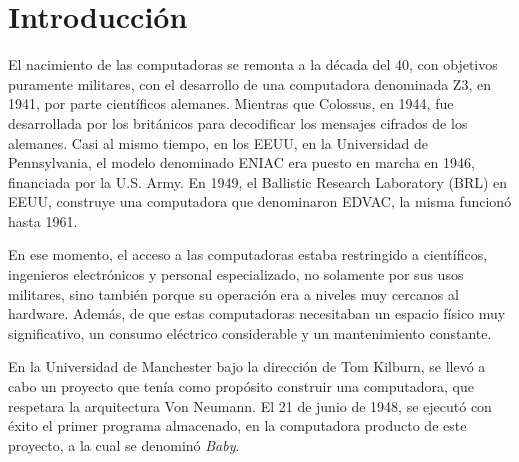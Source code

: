 \documentclass[%
  	final,
%
	notitlepage,
	narroweqnarray,
	inline,
 	twoside,
	]{ieee}
\begin{document}
\begin{abstract} 

El nacimiento de los desarrollos inform\'aticos en Argentina se puede asociar con la importaci\'on de la primera computadora: Clementina. 

Dentro de los desarrollos nacionales, se destacan, proyectos acad\'emicos llevados a cabo en universidades p\'ublicas de nuestro pa\'is, tales como en la de Buenos Aires y Bah\'ia Blanca, que marcaron h\'itos en la historia de la inform\'atica.

A nivel industrial, existieron varios proyectos de empresas nacionales, que generaron muy buenos resultados, pero no perduraron mucho tiempo en el mercado. 

En el desarrollo del presente trabajo profundizaremos en proyectos, tanto a nivel industrial como acad\'emico, que mostraran las distintas situaciones abordadas por nuestro pa\'is en las diferentes etapas pol\'iticas. 

\end{abstract}
\newpage
\section{Introducci\'on}

El nacimiento de las computadoras se remonta a la d\'ecada del 40, con objetivos puramente militares, con el desarrollo de una computadora denominada Z3, en 1941, por parte cient\'ificos alemanes. Mientras que Colossus, en 1944, fue desarrollada por los brit\'anicos para decodificar los mensajes cifrados de los alemanes. Casi al mismo tiempo, en los EEUU, en la Universidad de Pennsylvania, el modelo denominado ENIAC era puesto en marcha en 1946, financiada por la U.S. Army. En 1949, el Ballistic Research Laboratory (BRL) en EEUU, construye una computadora que denominaron EDVAC, la misma funcion\'o hasta 1961.

En ese momento, el acceso a las computadoras estaba restringido a cient\'ificos, ingenieros electr\'onicos y personal especializado, no solamente por sus usos militares, sino tambi\'en porque su operaci\'on era a niveles muy cercanos al hardware. Adem\'as, de que estas computadoras necesitaban un espacio f\'isico muy significativo, un consumo el\'ectrico considerable y un mantenimiento constante.

En la Universidad de Manchester bajo la direcci\'on de Tom Kilburn, se llev\'o a cabo un proyecto que ten\'ia como prop\'osito construir una computadora, que respetara la arquitectura Von Neumann. El 21 de junio de 1948, se ejecut\'o con \'exito el primer programa almacenado, en la computadora producto de este proyecto, a la cual se denomin\'o \textit{Baby}. 
\end{document}
